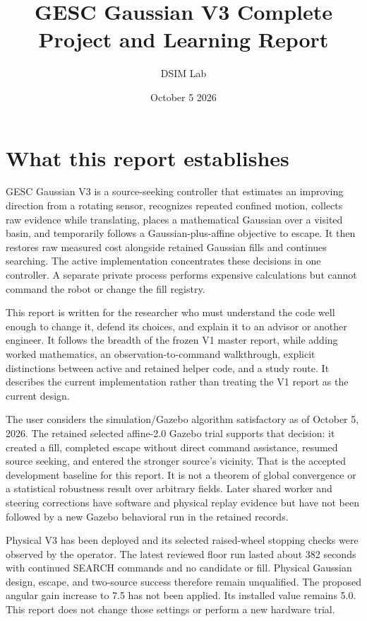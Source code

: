 \documentclass[
  10pt,
  letterpaper,
]{article}
\title{GESC Gaussian V3 Complete Project and Learning Report}
\author{DSIM Lab}
\date{October 5 2026}
\begin{document}
\maketitle

{
\setcounter{tocdepth}{2}
\tableofcontents
}
\clearpage

\section{What this report
establishes}\label{what-this-report-establishes}

GESC Gaussian V3 is a source-seeking controller that estimates an
improving direction from a rotating sensor, recognizes repeated confined
motion, collects raw evidence while translating, places a mathematical
Gaussian over a visited basin, and temporarily follows a
Gaussian-plus-affine objective to escape. It then restores raw measured
cost alongside retained Gaussian fills and continues searching. The
active implementation concentrates these decisions in one controller. A
separate private process performs expensive calculations but cannot
command the robot or change the fill registry.

This report is written for the researcher who must understand the code
well enough to change it, defend its choices, and explain it to an
advisor or another engineer. It follows the breadth of the frozen V1
master report, while adding worked mathematics, an
observation-to-command walkthrough, explicit distinctions between active
and retained helper code, and a study route. It describes the current
implementation rather than treating the V1 report as the current design.

The user considers the simulation/Gazebo algorithm satisfactory as of
October 5, 2026. The retained selected affine-2.0 Gazebo trial supports
that decision: it created a fill, completed escape without direct
command assistance, resumed source seeking, and entered the stronger
source's vicinity. That is the accepted development baseline for this
report. It is not a theorem of global convergence or a statistical
robustness result over arbitrary fields. Later shared worker and
steering corrections have software and physical replay evidence but have
not been followed by a new Gazebo behavioral run in the retained
records.

Physical V3 has been deployed and its selected raised-wheel stopping
checks were observed by the operator. The latest reviewed floor run
lasted about 382 seconds with continued SEARCH commands and no candidate
or fill. Physical Gaussian design, escape, and two-source success
therefore remain unqualified. The proposed angular gain increase to 7.5
has not been applied. Its installed value remains 5.0. This report does
not change those settings or perform a new hardware trial.
\end{document}
